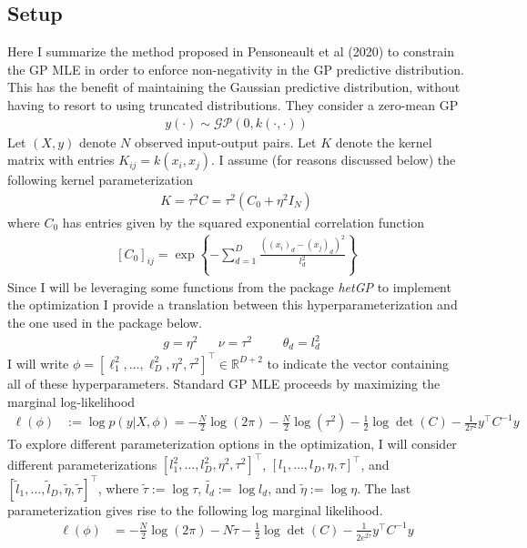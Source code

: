 \documentclass[12pt]{article}
\newcommand{\R}{\mathbb{R}}
\begin{document}
\subsection{Setup}
Here I summarize the method proposed in Pensoneault et al (2020) to constrain the GP MLE in order to enforce non-negativity in the GP predictive 
distribution. This has the benefit of maintaining the Gaussian predictive distribution, without having to resort to using truncated distributions. 
They consider a zero-mean GP 
\begin{align*}
y(\cdot) \sim \mathcal{GP}(0, k(\cdot, \cdot)) 
\end{align*}
Let $(X, y)$ denote $N$ observed input-output pairs. Let $K$ denote the kernel matrix with entries $K_{ij} = k(x_i, x_j)$. 
I assume (for reasons discussed below) the following kernel parameterization 
\begin{align*}
K = \tau^2 C = \tau^2 \left(C_0 + \eta^2 I_N \right)
\end{align*}
where $C_0$ has entries given by the squared exponential correlation function 
\begin{align*}
\left[C_0\right]_{ij} = \exp\left\{-\sum_{d = 1}^{D} \frac{((x_i)_d - (x_j)_d)^2}{l^2_d} \right\}
\end{align*}
Since I will be leveraging some functions from the package \textit{hetGP} to implement the optimization I provide a translation between 
this hyperparameterization and the one used in the package below. 
\begin{align*}
&g = \eta^2 &&\nu = \tau^2 &&&\theta_d = l_d^2
\end{align*}
I will write $\phi = \left[\ell_1^2, \dots, \ell_D^2, \eta^2, \tau^2 \right]^\top \in \R^{D+2}$ to indicate the vector containing all of these hyperparameters. 
Standard GP MLE proceeds by maximizing the marginal log-likelihood
\begin{align*}
\ell(\phi) &:= \log p(y|X, \phi) = -\frac{N}{2}  \log(2\pi) - \frac{N}{2}\log(\tau^2) - \frac{1}{2} \log \det(C) - \frac{1}{2\tau^2} y^\top C^{-1}y
\end{align*}
To explore different parameterization options in the optimization, I will consider different parameterizations $\left[l_1^2, \dots, l_D^2, \eta^2, \tau^2 \right]^\top$, 
$\left[l_1, \dots, l_D, \eta, \tau \right]^\top$, and $\left[\tilde{l}_1, \dots, \tilde{l}_D, \tilde{\eta}, \tilde{\tau} \right]^\top$, where 
$\tilde{\tau} := \log \tau$, $\tilde{l_d} := \log l_d$, and $\tilde{\eta} := \log \eta$. The last parameterization gives rise to the following log marginal likelihood. 
\begin{align*}
\ell(\phi) &= -\frac{N}{2}  \log(2\pi) - N \tilde{\tau} - \frac{1}{2} \log \det(C) - \frac{1}{2e^{2\tilde{\tau}}} y^\top C^{-1}y
\end{align*}
\end{document}
